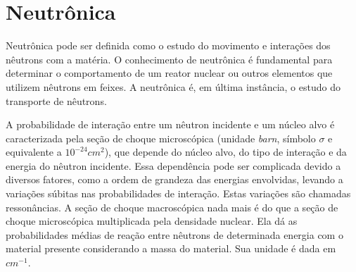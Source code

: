 



\section{Neutrônica}
\label{sec:neutronica}

Neutrônica pode ser definida como o estudo do movimento e interações dos nêutrons
com a matéria. O conhecimento de neutrônica é fundamental para determinar o
comportamento de um reator nuclear ou outros elementos que utilizem nêutrons
em feixes. A neutrônica é, em última instância, o estudo do transporte de nêutrons.

A probabilidade de interação entre um nêutron incidente e um núcleo alvo é caracterizada
pela seção de choque microscópica (unidade \textit{barn}, símbolo $\sigma$ e
equivalente a $10^{-24} cm^2$), que depende do núcleo alvo, do tipo de interação e da
energia do nêutron incidente. Essa dependência pode ser complicada devido a diversos fatores,
como a ordem de grandeza das energias envolvidas, levando a variações súbitas nas probabilidades
de interação. Estas variações são chamadas ressonâncias. A seção de choque macroscópica nada mais
é do que a seção de choque microscópica multiplicada pela densidade nuclear. Ela dá as probabilidades
médias de reação entre nêutrons de determinada energia com o material presente considerando a massa
do material. Sua unidade é dada em $cm^{-1}$.


